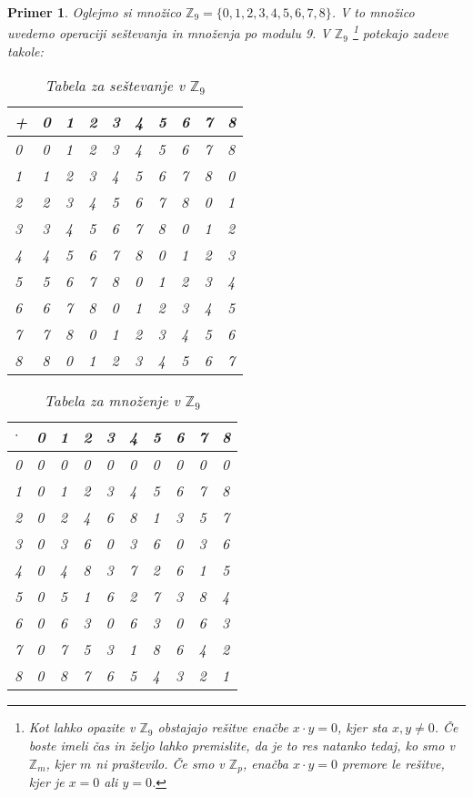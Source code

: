 \documentclass{amsart}
\newcommand{\ZZ}{\mathbb{Z}}
\newtheorem{primer}[izrek]{Primer}
\begin{document}
\begin{primer}
    Oglejmo si množico $\ZZ_9 = \{0,1,2,3,4,5,6,7,8\}$. V to množico uvedemo operaciji seštevanja in množenja  po modulu 9. V $\ZZ_9$
    \footnote{Kot lahko opazite v $\ZZ_9$ obstajajo rešitve enačbe $x\cdot y = 0$, kjer sta $x,y\neq0$. Če boste imeli čas in željo 
    lahko premislite, da je to res natanko tedaj, ko smo v $\ZZ_m$, kjer $m$ ni praštevilo. Če smo v $\ZZ_p$, enačba $x\cdot y = 0$ 
    premore le rešitve, kjer je $x = 0$ ali $y= 0$.}
    potekajo zadeve takole: 
    \begin{table}[htp]
        \centering
        \begin{tabular}{|l|l|l|l|l|l|l|l|l|l|}
        \hline
        \textbf{+}& \textbf{0} & \textbf{1}& \textbf{2}& \textbf{3}& \textbf{4}& \textbf{5}& \textbf{6}& \textbf{7}& \textbf{8} \\ \hline
        0 &0 &1 &2 &3 &4 &5 &6 &7 &8 \\ \hline
        1 &1 &2 &3 &4 &5 &6 &7 &8 &0 \\ \hline
        2 &2 &3 &4 &5 &6 &7 &8 &0 &1 \\ \hline
        3 &3 &4 &5 &6 &7 &8 &0 &1 &2 \\ \hline
        4 &4 &5 &6 &7 &8 &0 &1 &2 &3 \\ \hline
        5 &5 &6 &7 &8 &0 &1 &2 &3 &4 \\ \hline
        6 &6 &7 &8 &0 &1 &2 &3 &4 &5 \\ \hline
        7 &7 &8 &0 &1 &2 &3 &4 &5 &6 \\ \hline
        8 &8 &0 &1 &2 &3 &4 &5 &6 &7 \\ \hline
        \end{tabular}
        \caption{Tabela za seštevanje v $\ZZ_9$}
        \label{plus}
      \end{table}

      \begin{table}[htp]
        \centering
        \begin{tabular}{|l|l|l|l|l|l|l|l|l|l|}
        \hline
        \textbf{$\cdot$}& \textbf{0} & \textbf{1}& \textbf{2}& \textbf{3}& \textbf{4}& \textbf{5}& \textbf{6}& \textbf{7}& \textbf{8} \\ \hline
        0 &0 &0 &0 &0 &0 &0 &0 &0 &0 \\ \hline
        1 &0 &1 &2 &3 &4 &5 &6 &7 &8 \\ \hline
        2 &0 &2 &4 &6 &8 &1 &3 &5 &7 \\ \hline
        3 &0 &3 &6 &0 &3 &6 &0 &3 &6 \\ \hline
        4 &0 &4 &8 &3 &7 &2 &6 &1 &5 \\ \hline
        5 &0 &5 &1 &6 &2 &7 &3 &8 &4 \\ \hline
        6 &0 &6 &3 &0 &6 &3 &0 &6 &3 \\ \hline
        7 &0 &7 &5 &3 &1 &8 &6 &4 &2 \\ \hline
        8 &0 &8 &7 &6 &5 &4 &3 &2 &1 \\ \hline
        \end{tabular}
        \caption{Tabela za množenje v $\ZZ_9$}
        \label{krat}
      \end{table}
\end{primer}
\newpage
\end{document}
